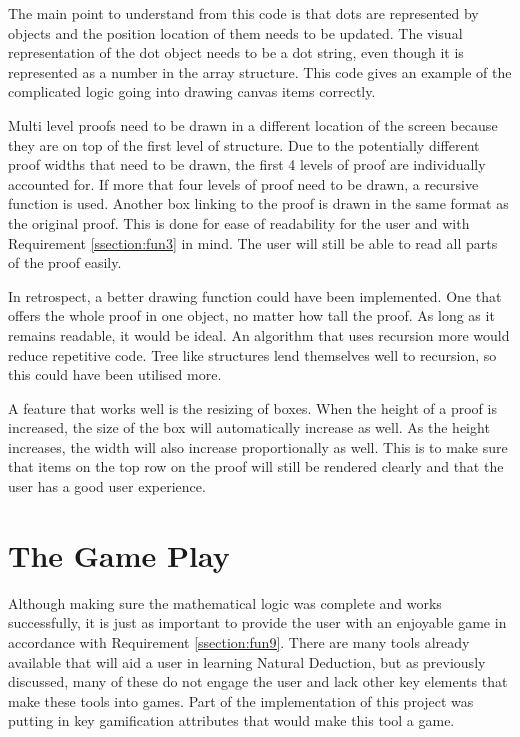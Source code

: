 The main point to understand from this code is that dots are represented by objects and the position location of them needs to be updated. The visual representation of the dot object needs to be a dot string, even though it is represented as a number in the array structure. This code gives an example of the complicated logic going into drawing canvas items correctly.

Multi level proofs need to be drawn in a different location of the screen because they are on top of the first level of structure. Due to the potentially different proof widths that need to be drawn, the first 4 levels of proof are individually accounted for. If more that four levels of proof need to be drawn, a recursive function is used. Another box linking to the proof is drawn in the same format as the original proof. This is done for ease of readability for the user and with Requirement \ref{ssection:fun3} in mind. The user will still be able to read all parts of the proof easily.

In retrospect, a better drawing function could have been implemented. One that offers the whole proof in one object, no matter how tall the proof. As long as it remains readable, it would be ideal. An algorithm that uses recursion more would reduce repetitive code. Tree like structures lend themselves well to recursion, so this could have been utilised more. 

A feature that works well is the resizing of boxes. When the height of a proof is increased, the size of the box will automatically increase as well. As the height increases, the width will also increase proportionally as well. This is to make sure that items on the top row on the proof will still be rendered clearly and that the user has a good user experience.

\section{The Game Play}

Although making sure the mathematical logic was complete and works successfully, it is just as important to provide the user with an enjoyable game in accordance with Requirement \ref{ssection:fun9}. There are many tools already available that will aid a user in learning Natural Deduction, but as previously discussed, many of these do not engage the user and lack other key elements that make these tools into games. Part of the implementation of this project was putting in key gamification attributes that would make this tool a game.


